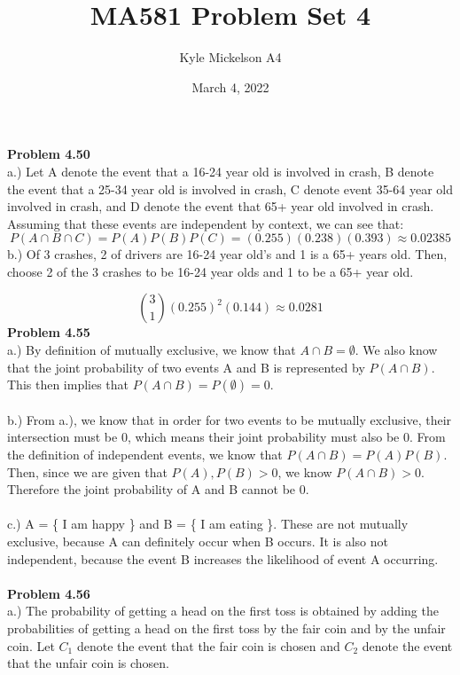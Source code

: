 \documentclass{article}
\title{MA581 Problem Set 4}
\author{Kyle Mickelson A4}
\date{March 4, 2022}
\begin{document}
\maketitle

\noindent\textbf{Problem 4.50}\\
a.) Let A denote the event that a 16-24 year old is involved in crash, B denote the event that a 25-34 year old is involved in crash, C denote event 35-64 year old involved in crash, and D denote the event that 65+ year old involved in crash. Assuming that these events are independent by context, we can see that:
    $$ P(A\cap\!B\cap\!C) = P(A)P(B)P(C) = (0.255)(0.238)(0.393) \approx 0.02385$$
b.) Of 3 crashes, 2 of drivers are 16-24 year old's and 1 is a 65+ years old.
Then, choose 2 of the 3 crashes to be 16-24 year olds and 1 to be a 65+ year old.

$$ \binom{3}{1}(0.255)^{2}(0.144) \approx 0.0281  $$
\noindent\textbf{Problem 4.55}\\
a.) By definition of mutually exclusive, we know that $A\cap B = \emptyset$. We also know that the joint probability of two events A and B is represented by $P(A\cap\!B)$. This then implies that $P(A\cap B) = P(\emptyset) = 0$.
\\\\
b.) From a.), we know that in order for two events to be mutually exclusive, their intersection must be 0, which means their joint probability must also be 0. From the definition of independent events, we know that $P(A\cap B) = P(A)P(B)$. Then, since we are given that $P(A),P(B)>0$, we know $P(A\cap\!B)>0$. Therefore the joint probability of A and B cannot be 0. 
\\\\
c.) A = \{ I am happy \} and B = \{ I am eating \}. These are not mutually exclusive, because A can definitely occur when B occurs. It is also not independent, because the event B increases the likelihood of event A occurring. 
\\\\
\noindent\textbf{Problem 4.56}\\
a.) The probability of getting a head on the first toss is obtained by adding the probabilities of getting a head on the first toss by the fair coin and by the unfair coin. Let $C_{1}$ denote the event that the fair coin is chosen and $C_{2}$ denote the event that the unfair coin is chosen.
\end{document}
